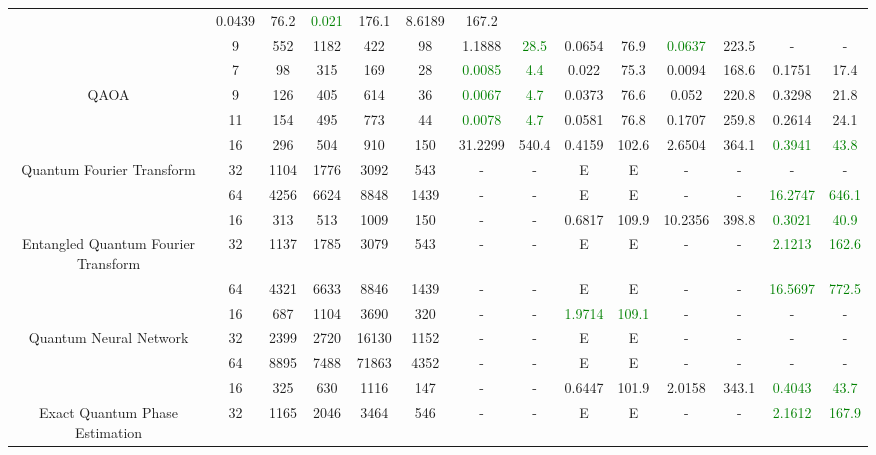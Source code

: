 \begin{table}[htb]
{\begin{tabular}{|c|c|c|c|c|c|c|c|c|c|c|c|c|c|}
 & 0.0439 & 76.2
 & \textcolor{green}{0.021} & 176.1
 & 8.6189 & 167.2
 \\
 & 
9 & 552 & 1182 & 422 & 98
 & 1.1888 & \textcolor{green}{28.5}
 & 0.0654 & 76.9
 & \textcolor{green}{0.0637} & 223.5
 & - & -
 \\
\hline
 & 
7 & 98 & 315 & 169 & 28
 & \textcolor{green}{0.0085} & \textcolor{green}{4.4}
 & 0.022 & 75.3
 & 0.0094 & 168.6
 & 0.1751 & 17.4
 \\
QAOA & 
9 & 126 & 405 & 614 & 36
 & \textcolor{green}{0.0067} & \textcolor{green}{4.7}
 & 0.0373 & 76.6
 & 0.052 & 220.8
 & 0.3298 & 21.8
 \\
 & 
11 & 154 & 495 & 773 & 44
 & \textcolor{green}{0.0078} & \textcolor{green}{4.7}
 & 0.0581 & 76.8
 & 0.1707 & 259.8
 & 0.2614 & 24.1
 \\
\hline
 & 
16 & 296 & 504 & 910 & 150
 & 31.2299 & 540.4
 & 0.4159 & 102.6
 & 2.6504 & 364.1
 & \textcolor{green}{0.3941} & \textcolor{green}{43.8}
 \\
Quantum Fourier Transform & 
32 & 1104 & 1776 & 3092 & 543
 & - & -
 & E & E
 & - & -
 & - & -
 \\
 & 
64 & 4256 & 6624 & 8848 & 1439
 & - & -
 & E & E
 & - & -
 & \textcolor{green}{16.2747} & \textcolor{green}{646.1}
 \\
\hline
 & 
16 & 313 & 513 & 1009 & 150
 & - & -
 & 0.6817 & 109.9
 & 10.2356 & 398.8
 & \textcolor{green}{0.3021} & \textcolor{green}{40.9}
 \\
Entangled Quantum Fourier Transform & 
32 & 1137 & 1785 & 3079 & 543
 & - & -
 & E & E
 & - & -
 & \textcolor{green}{2.1213} & \textcolor{green}{162.6}
 \\
 & 
64 & 4321 & 6633 & 8846 & 1439
 & - & -
 & E & E
 & - & -
 & \textcolor{green}{16.5697} & \textcolor{green}{772.5}
 \\
\hline
 & 
16 & 687 & 1104 & 3690 & 320
 & - & -
 & \textcolor{green}{1.9714} & \textcolor{green}{109.1}
 & - & -
 & - & -
 \\
Quantum Neural Network & 
32 & 2399 & 2720 & 16130 & 1152
 & - & -
 & E & E
 & - & -
 & - & -
 \\
 & 
64 & 8895 & 7488 & 71863 & 4352
 & - & -
 & E & E
 & - & -
 & - & -
 \\
\hline
 & 
16 & 325 & 630 & 1116 & 147
 & - & -
 & 0.6447 & 101.9
 & 2.0158 & 343.1
 & \textcolor{green}{0.4043} & \textcolor{green}{43.7}
 \\
Exact Quantum Phase Estimation & 
32 & 1165 & 2046 & 3464 & 546
 & - & -
 & E & E
 & - & -
 & \textcolor{green}{2.1612} & \textcolor{green}{167.9}

\end{tabular}}
\end{table}
